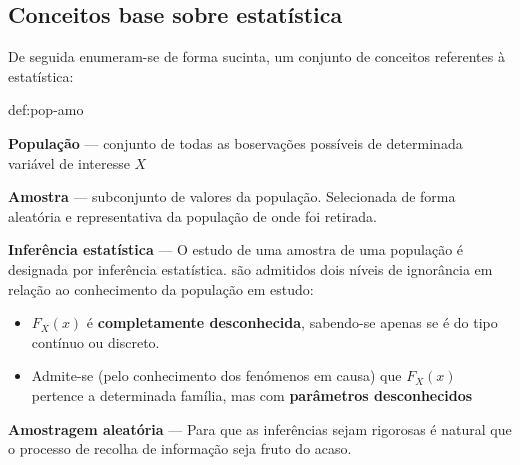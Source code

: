 \subsection[4.1 Conceitos base sobre estatística]{\hspace*{0.075 em}\raisebox{0.2 em}{$\pmb{\drsh}$} Conceitos base sobre estatística}

\noindent De seguida enumeram-se de forma sucinta, um conjunto de conceitos referentes à estatística:

\begin{theo}{def:pop-amo}\label{def:pop-amo}

    \noindent\textbf{População} --- conjunto de todas as boservações possíveis de determinada variável de interesse $X$

    \vspace{1 em}
    \noindent \textbf{Amostra} --- subconjunto de valores da população. Selecionada de forma aleatória e representativa da população de onde foi retirada.
\end{theo}

\noindent \textbf{Inferência estatística} --- O estudo de uma amostra de uma população é designada por inferência estatística. são admitidos dois níveis de ignorância em relação ao conhecimento da população em estudo:

{

\begin{mdframed}
    \begin{itemize}[leftmargin=*]
        \item $F_X(x)$ é \textbf{completamente desconhecida}, sabendo-se apenas se é do tipo contínuo ou discreto.
    
        \item Admite-se (pelo conhecimento dos fenómenos em causa) que $F_X(x)$ pertence a determinada família, mas com \textbf{parâmetros desconhecidos}
    \end{itemize}
\end{mdframed}
}

\noindent \textbf{Amostragem aleatória} --- Para que as inferências sejam rigorosas é natural que o processo de recolha de informação seja fruto do acaso.

